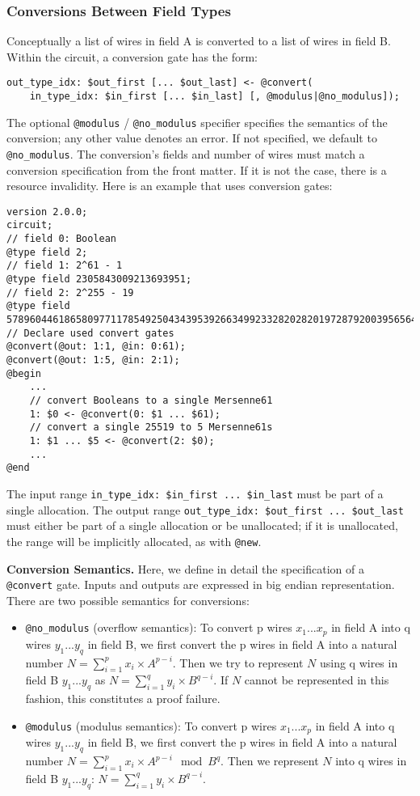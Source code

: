 \subsubsection{Conversions Between Field Types}
Conceptually a list of wires in field A is converted to a list of wires in field B.
Within the circuit, a conversion gate has the form:
\begin{lstlisting}[language=ir]
out_type_idx: $out_first [... $out_last] <- @convert(
    in_type_idx: $in_first [... $in_last] [, @modulus|@no_modulus]);
\end{lstlisting}
The optional \texttt{@modulus} / \texttt{@no\_modulus} specifier specifies the semantics of the conversion; any other value denotes an error.
If not specified, we default to \texttt{@no\_modulus}.
%
The conversion's fields and number of wires must match a conversion specification from the front matter. If it is not the case, there is a resource invalidity.
Here is an example that uses conversion gates:
\begin{lstlisting}[language=ir]
version 2.0.0;
circuit;
// field 0: Boolean
@type field 2;
// field 1: 2^61 - 1
@type field 2305843009213693951;
// field 2: 2^255 - 19
@type field 57896044618658097711785492504343953926634992332820282019728792003956564819949;
// Declare used convert gates
@convert(@out: 1:1, @in: 0:61);
@convert(@out: 1:5, @in: 2:1);
@begin
    ...
    // convert Booleans to a single Mersenne61
    1: $0 <- @convert(0: $1 ... $61);
    // convert a single 25519 to 5 Mersenne61s
    1: $1 ... $5 <- @convert(2: $0);
    ...
@end
\end{lstlisting}
%
The input range \texttt{in\_type\_idx: \$in\_first ... \$in\_last} must be part
of a single allocation.
The output range \texttt{out\_type\_idx: \$out\_first ... \$out\_last} must
either be part of a single allocation or be unallocated; if it is unallocated,
the range will be implicitly allocated, as with \texttt{@new}.

\medbreak\noindent\textbf{Conversion Semantics.}\label{sec:conversion-semantics}
Here, we define in detail the specification of a \texttt{@convert} gate.
Inputs and outputs are expressed in big endian representation.
There are two possible semantics for conversions:
\begin{itemize}
  \item \texttt{@no\_modulus} (overflow semantics):
        To convert p wires $x_1 ... x_p$ in field A into q wires $y_1 ... y_q$ in field B, we first convert the p wires in field A into a natural number $N = \sum_{i=1}^p x_i \times A^{p-i}$.
        Then we try to represent $N$ using q wires in field B $y_1 ... y_q$ as $N = \sum_{i=1}^q y_i \times B^{q-i}$.
        If $N$ cannot be represented in this fashion, this constitutes a proof failure.

  \item \texttt{@modulus} (modulus semantics):
        To convert p wires $x_1 ... x_p$ in field A into q wires $y_1 ... y_q$ in field B, we first convert the p wires in field A into a natural number $N = \sum_{i=1}^p x_i \times A^{p-i} \mod B^q$.
        Then we represent $N$ into q wires in field B $y_1 ... y_q$: $N = \sum_{i=1}^q y_i \times B^{q-i}$.
\end{itemize}

